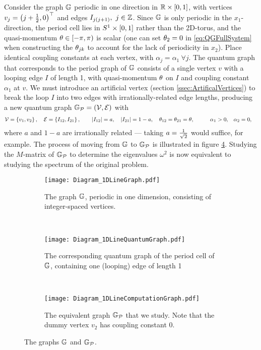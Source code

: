 Consider the graph $\mathbb{G}$ periodic in one direction in $\mathbb{R}\times\left[ 0,1 \right]$, with vertices $v_j = \left( j + \frac{1}{2}, 0 \right)^\top$ and edges $I_{j\bracs{j+1}}, \ j\in\integers$.
Since $\mathbb{G}$ is only periodic in the $x_1$-direction, the period cell lies in $S^1\times\left[ 0,1 \right]$ rather than the 2D-torus, and the quasi-momentum $\theta\in\left[-\pi,\pi\right)$ is scalar (one can set $\theta_2=0$ in \eqref{eq:QGFullSystem} when constructing the $\theta_{jk}$ to account for the lack of periodicity in $x_2$).
Place identical coupling constants at each vertex, with $\alpha_j = \alpha_1 \ \forall j$.
The quantum graph that corresponds to the period graph of $\mathbb{G}$ consists of a single vertex $v$ with a looping edge $I$ of length 1, with quasi-momentum $\theta$ on $I$ and coupling constant $\alpha_1$ at $v$.
We must introduce an artificial vertex (section \ref{ssec:ArtificalVertices}) to break the loop $I$ into two edges with irrationally-related edge lengths, producing a new quantum graph $\mathbb{G}_{\mathcal{P}}=\left( \mathcal{V}, \mathcal{E} \right)$ with
\begin{align*}
	\mathcal{V} = \left\{  v_1 , v_2  \right\}, \quad \mathcal{E} = \left\{  I_{12}, I_{21}  \right\},
	&\qquad \left\lvert I_{12} \right\rvert = a, \quad \left\lvert I_{21} \right\rvert = 1-a, \quad \theta_{12} = \theta_{21} = \theta, 
	&\qquad \alpha_1 >0, \quad &\alpha_2 = 0,
\end{align*}
where $a$ and $1-a$ are irrationally related --- taking $a = \frac{1}{\sqrt{2}}$ would suffice, for example.
The process of moving from $\mathbb{G}$ to $\mathbb{G}_{\mathcal{P}}$ is illustrated in figure \ref{fig:Diagram_1DExample}.
Studying the $M$-matrix of $\mathbb{G}_{\mathcal{P}}$ to determine the eigenvalues $\omega^2$ is now equivalent to studying the spectrum of the original problem.
\begin{figure}[b!]
	\centering
	\begin{subfigure}[t]{0.3\textwidth}
		\centering
		\texttt{[image: Diagram\_1DLineGraph.pdf]}
		\caption{\label{fig:Diagram_1DLineGraph} The graph $\mathbb{G}$, periodic in one dimension, consisting of integer-spaced vertices.}
	\end{subfigure}
	~
	\begin{subfigure}[t]{0.3\textwidth}
		\centering
		\texttt{[image: Diagram\_1DLineQuantumGraph.pdf]}
		\caption{\label{fig:Diagram_1DLineQuantumGraph} The corresponding quantum graph of the period cell of $\mathbb{G}$, containing one (looping) edge of length 1}
	\end{subfigure}
	~
	\begin{subfigure}[t]{0.3\textwidth}
		\centering
		\texttt{[image: Diagram\_1DLineComputationGraph.pdf]}	
		\caption{\label{fig:Diagram_1DLineComputationGraph} The equivalent graph $\mathbb{G}_{\mathcal{P}}$ that we study. Note that the dummy vertex $v_2$ has coupling constant 0.}
	\end{subfigure}
	\caption{\label{fig:Diagram_1DExample} The graphs $\mathbb{G}$ and $\mathbb{G}_{\mathcal{P}}$.}
\end{figure} \newline

